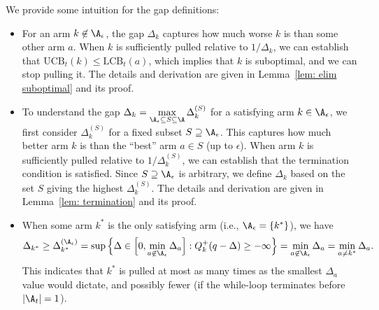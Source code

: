\begin{remark}
    We provide some intuition for the gap definitions:
\begin{itemize}[topsep=0pt,itemsep=0pt]
    \item 
    For an arm $k \not\in \A_{\epsilon}$, the gap
    $\Delta_{k}$ captures how much worse $k$ is than some other arm $a$. 
    When $k$ is sufficiently pulled relative to $1/\Delta_{k}$, 
    we can establish that
    $\mathrm{UCB}_t(k) \le \mathrm{LCB}_t(a)$, 
    which implies that $k$ is suboptimal, and we can stop pulling it. The details and derivation are given in Lemma~\ref{lem: elim suboptimal} and its proof.
    
    \item 

     To understand the gap $\Delta_{k} = \max\limits_{\A_{\epsilon} \subseteq S \subseteq \A}
        \Delta_{k}^{(S)}$ for a satisfying arm $k \in \A_{\epsilon}$,
    we first consider $\Delta_{k}^{(S)}$ for a fixed subset $S \supseteq \A_{\epsilon}$.
     This captures how much better arm $k$ is than the ``best'' arm $a \in S$ (up to $\epsilon$). 
     When arm $k$ is sufficiently pulled relative to $1/\Delta_{k}^{(S)}$, we can establish that 
    the termination condition is satisfied.
    Since $S \supseteq \A_{\epsilon}$ is arbitrary, we define $\Delta_{k}$ based on the set $S$ giving the highest $\Delta_{k}^{(S)}$.
     The details and derivation are given in Lemma~\ref{lem: termination} and its proof.
    
    \item When some arm $k^*$ is the only satisfying arm (i.e., $\A_{\epsilon} = \{k^*\}$), we have 
    \begin{equation}
    \label{eq: lower bound k* arm gap}
    \Delta_{k^*}  
     \ge  \Delta_{k^*}^{(\A_{\epsilon})}
     = \sup  \Big\{   \Delta \in 
       \Big[0, \min_{a \not\in \A_{\epsilon}} \Delta_a \Big] :
        Q^+_k(q - \Delta)  \ge  -\infty
        \Big\} 
    = \min\limits_{a \not\in \A_{\epsilon}} \Delta_a
    = \min\limits_{a \neq k^*} \Delta_a.
    \end{equation}
    This indicates that $k^*$ is pulled at most as many times as the smallest $\Delta_a$ value would dictate, and possibly fewer (if the while-loop terminates before $|\A_t| = 1$).    
\end{itemize}
\end{remark}


